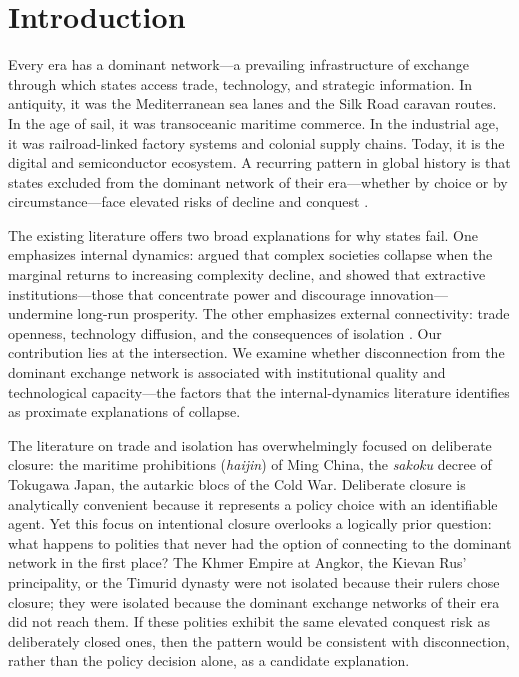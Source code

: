 \documentclass[pdflatex,sn-basic]{sn-jnl}
\theoremstyle{thmstyleone}%
\theoremstyle{thmstyletwo}%
\theoremstyle{thmstylethree}%
\begin{document}
\section{Introduction}\label{sec:intro}

Every era has a dominant network---a prevailing infrastructure of exchange through which states access trade, technology, and strategic information. In antiquity, it was the Mediterranean sea lanes and the Silk Road caravan routes. In the age of sail, it was transoceanic maritime commerce. In the industrial age, it was railroad-linked factory systems and colonial supply chains. Today, it is the digital and semiconductor ecosystem. A recurring pattern in global history is that states excluded from the dominant network of their era---whether by choice or by circumstance---face elevated risks of decline and conquest \citep{Kennedy1987, FindlayORourke2007}.

The existing literature offers two broad explanations for why states fail. One emphasizes internal dynamics: \citet{Tainter1988} argued that complex societies collapse when the marginal returns to increasing complexity decline, and \citet{AcemogluRobinson2012} showed that extractive institutions---those that concentrate power and discourage innovation---undermine long-run prosperity. The other emphasizes external connectivity: trade openness, technology diffusion, and the consequences of isolation \citep{FindlayORourke2007, Mokyr2002}. Our contribution lies at the intersection. We examine whether disconnection from the dominant exchange network is associated with institutional quality and technological capacity---the factors that the internal-dynamics literature identifies as proximate explanations of collapse.

The literature on trade and isolation has overwhelmingly focused on deliberate closure: the maritime prohibitions (\emph{haijin}) of Ming China, the \emph{sakoku} decree of Tokugawa Japan, the autarkic blocs of the Cold War. Deliberate closure is analytically convenient because it represents a policy choice with an identifiable agent. Yet this focus on intentional closure overlooks a logically prior question: what happens to polities that never had the option of connecting to the dominant network in the first place? The Khmer Empire at Angkor, the Kievan Rus' principality, or the Timurid dynasty were not isolated because their rulers chose closure; they were isolated because the dominant exchange networks of their era did not reach them. If these polities exhibit the same elevated conquest risk as deliberately closed ones, then the pattern would be consistent with disconnection, rather than the policy decision alone, as a candidate explanation.
\end{document}
